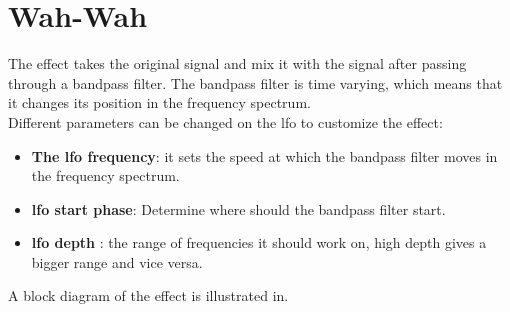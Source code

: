 \section{Wah-Wah}

The effect takes the original signal and mix it with the signal after passing through a bandpass filter. The bandpass filter is time varying, which means that it changes its position in the frequency spectrum. \\
Different parameters can be changed on the \gls{lfo} to customize the effect:\\

\begin{itemize}
	\item \textbf{The \gls{lfo} frequency}: it sets the speed at which the bandpass filter moves in the frequency spectrum.
	\item \textbf{\gls{lfo} start phase}: Determine where should the bandpass filter start.
	\item \textbf{\gls{lfo} depth} : the range of frequencies it should work on, high depth gives a bigger range and vice versa.
\end{itemize}

A block diagram of the effect is illustrated in.  
